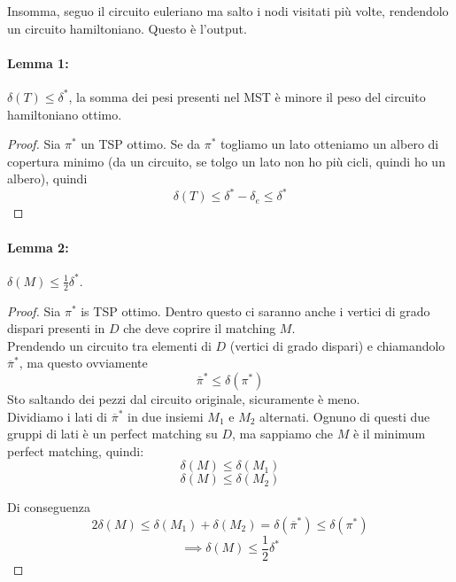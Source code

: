 Insomma, seguo il circuito euleriano ma salto i nodi visitati più volte, rendendolo un circuito hamiltoniano. Questo è l'output.\\

\newpage

\paragraph{Lemma 1:} $\delta (T) \leq \delta^\ast$, la somma dei pesi presenti nel MST è minore il peso del circuito hamiltoniano ottimo.\\

\begin{proof}
	Sia $\pi^\ast$ un TSP ottimo. Se da $\pi^\ast$ togliamo un lato otteniamo un albero di copertura minimo (da un circuito, se tolgo un lato non ho più cicli, quindi ho un albero), quindi 
	$$ \delta (T) \leq \delta^\ast - \delta_e \leq \delta^\ast $$
\end{proof}

\paragraph{Lemma 2:} $\delta(M) \leq \frac{1}{2} \delta^\ast$.\\

\begin{proof}
	Sia $\pi^\ast$ is TSP ottimo. Dentro questo ci saranno anche i vertici di grado dispari presenti in $D$ che deve coprire il matching $M$.\\
	
	Prendendo un circuito tra elementi di $D$ (vertici di grado dispari) e chiamandolo $\overline{\pi}^\ast$, ma questo ovviamente 
	$$\overline{\pi}^\ast \leq \delta (\pi^\ast) $$
	Sto saltando dei pezzi dal circuito originale, sicuramente è meno.\\
	
	Dividiamo i lati di $\overline{\pi}^\ast$ in due insiemi $M_1$ e $M_2$ alternati. Ognuno di questi due gruppi di lati è un perfect matching su $D$, ma sappiamo che $M$  è il minimum perfect matching, quindi:
	$$ \delta (M) \leq \delta (M_1) $$
	$$ \delta (M) \leq \delta (M_2) $$
	
	Di conseguenza
	$$ 2 \delta (M) \leq \delta (M_1) + \delta (M_2)  = \delta (\overline{\pi}^\ast) \leq \delta (\pi^\ast)$$
	$$ \implies \delta (M) \leq \frac{1}{2} \delta^\ast$$
\end{proof}

